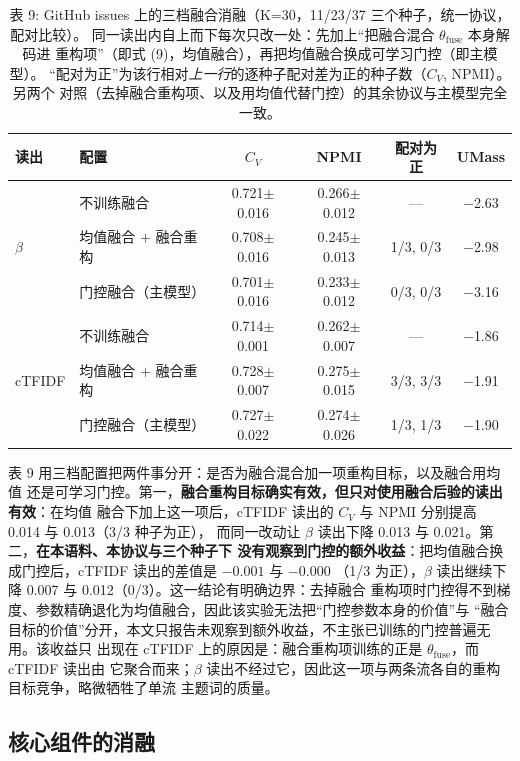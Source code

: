 \documentclass{article}
\begin{document}
\begin{table}[t]
\centering
\caption{表 9: GitHub issues 上的三档融合消融（K=30，11/23/37 三个种子，统一协议，配对比较）。
同一读出内自上而下每次只改一处：先加上“把融合混合 $\theta_{\mathrm{fuse}}$ 本身解码进
重构项”（即式 (9)，均值融合），再把均值融合换成可学习门控（即主模型）。
“配对为正”为该行相对\emph{上一行}的逐种子配对差为正的种子数（$C_V$, NPMI）。另两个
对照（去掉融合重构项、以及用均值代替门控）的其余协议与主模型完全一致。}
\label{tab:fusion}
\small
\begin{tabular}{llcccc}
\toprule
读出 & 配置 & $C_V$ & NPMI & 配对为正 & UMass \\
\midrule
\multirow{3}{*}{$\beta$} & 不训练融合 & 0.721$\pm$0.016 & 0.266$\pm$0.012 & --- & $-$2.63 \\
 & 均值融合 $+$ 融合重构 & 0.708$\pm$0.016 & 0.245$\pm$0.013 & 1/3, 0/3 & $-$2.98 \\
 & 门控融合（主模型） & 0.701$\pm$0.016 & 0.233$\pm$0.012 & 0/3, 0/3 & $-$3.16 \\
\midrule
\multirow{3}{*}{cTFIDF} & 不训练融合 & 0.714$\pm$0.001 & 0.262$\pm$0.007 & --- & $-$1.86 \\
 & 均值融合 $+$ 融合重构 & 0.728$\pm$0.007 & 0.275$\pm$0.015 & 3/3, 3/3 & $-$1.91 \\
 & 门控融合（主模型） & 0.727$\pm$0.022 & 0.274$\pm$0.026 & 1/3, 1/3 & $-$1.90 \\
\bottomrule
\end{tabular}
\end{table}

表 9 用三档配置把两件事分开：是否为融合混合加一项重构目标，以及融合用均值
还是可学习门控。第一，\textbf{融合重构目标确实有效，但只对使用融合后验的读出有效}：在均值
融合下加上这一项后，cTFIDF 读出的 $C_V$ 与 NPMI 分别提高 0.014 与 0.013（3/3 种子为正），
而同一改动让 $\beta$ 读出下降 0.013 与 0.021。第二，\textbf{在本语料、本协议与三个种子下
没有观察到门控的额外收益}：把均值融合换成门控后，cTFIDF 读出的差值是 $-0.001$ 与 $-0.000$
（1/3 为正），$\beta$ 读出继续下降 0.007 与 0.012（0/3）。这一结论有明确边界：去掉融合
重构项时门控得不到梯度、参数精确退化为均值融合，因此该实验无法把“门控参数本身的价值”与
“融合目标的价值”分开，本文只报告未观察到额外收益，不主张已训练的门控普遍无用。该收益只
出现在 cTFIDF 上的原因是：融合重构项训练的正是 $\theta_{\mathrm{fuse}}$，而 cTFIDF 读出由
它聚合而来；$\beta$ 读出不经过它，因此这一项与两条流各自的重构目标竞争，略微牺牲了单流
主题词的质量。

\subsection{核心组件的消融}
\end{document}
